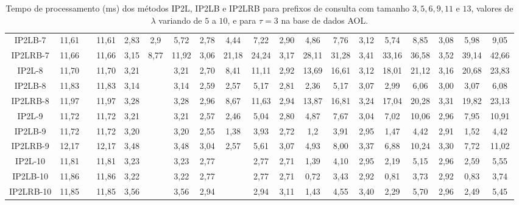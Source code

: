 \begin{table}[h]
{\begin{tabular}{c|ccc|ccc|ccc|ccc|ccc|ccc|}
\multicolumn{1}{|c|}{IP2LB-7} & 11,61 &  & 11,61 & 2,83 & 2,9 & 5,72 & 2,78 & 4,44 & 7,22 & 2,90 & 4,86 & 7,76 & 3,12 & 5,74 & 8,85 & 3,08 & 5,98 & 9,05 \\
\multicolumn{1}{|c|}{IP2LRB-7} & 11,66 &  & 11,66 & 3,15 & 8,77 & 11,92 & 3,06 & 21,18 & 24,24 & 3,17 & 28,11 & 31,28 & 3,41 & 33,16 & 36,58 & 3,52 & 39,14 & 42,66 \\ \hline
\multicolumn{1}{|c|}{IP2L-8} & 11,70 &  & 11,70 & 3,21 &  & 3,21 & 2,70 & 8,41 & 11,11 & 2,92 & 13,69 & 16,61 & 3,12 & 18,01 & 21,12 & 3,16 & 20,68 & 23,83 \\
\multicolumn{1}{|c|}{IP2LB-8} & 11,83 &  & 11,83 & 3,14 &  & 3,14 & 2,59 & 2,57 & 5,17 & 2,81 & 2,36 & 5,17 & 3,07 & 2,99 & 6,06 & 3,00 & 3,07 & 6,08 \\
\multicolumn{1}{|c|}{IP2LRB-8} & 11,97 &  & 11,97 & 3,28 &  & 3,28 & 2,96 & 8,67 & 11,63 & 2,94 & 13,87 & 16,81 & 3,24 & 17,04 & 20,28 & 3,31 & 19,82 & 23,13 \\ \hline
\multicolumn{1}{|c|}{IP2L-9} & 11,72 &  & 11,72 & 3,21 &  & 3,21 & 2,57 & 2,46 & 5,04 & 2,80 & 4,87 & 7,67 & 3,04 & 7,02 & 10,06 & 2,96 & 7,95 & 10,91 \\
\multicolumn{1}{|c|}{IP2LB-9} & 11,72 &  & 11,72 & 3,20 &  & 3,20 & 2,55 & 1,38 & 3,93 & 2,72 & 1,2 & 3,91 & 2,95 & 1,47 & 4,42 & 2,91 & 1,52 & 4,42 \\
\multicolumn{1}{|c|}{IP2LRB-9} & 12,17 &  & 12,17 & 3,48 &  & 3,48 & 3,04 & 2,57 & 5,61 & 3,07 & 4,93 & 8,00 & 3,37 & 6,88 & 10,24 & 3,30 & 7,72 & 11,02 \\ \hline
\multicolumn{1}{|c|}{IP2L-10} & 11,81 &  & 11,81 & 3,23 &  & 3,23 & 2,77 &  & 2,77 & 2,71 & 1,39 & 4,10 & 2,95 & 2,19 & 5,15 & 2,96 & 2,59 & 5,55 \\
\multicolumn{1}{|c|}{IP2LB-10} & 11,86 &  & 11,86 & 3,22 &  & 3,22 & 2,77 &  & 2,77 & 2,71 & 0,72 & 3,43 & 2,92 & 0,81 & 3,73 & 2,92 & 0,83 & 3,74 \\
\multicolumn{1}{|c|}{IP2LRB-10} & 11,85 &  & 11,85 & 3,56 &  & 3,56 & 2,94 &  & 2,94 & 3,11 & 1,43 & 4,55 & 3,40 & 2,29 & 5,70 & 2,96 & 2,49 & 5,45 \\ \hline
\end{tabular}%
}
\caption{Tempo de processamento (ms) dos métodos IP2L, IP2LB e IP2LRB para prefixos de consulta com tamanho $3,5,6,9,11$ e $13$, valores de $\lambda$ variando de $5$ a $10$, e para $\tau=3$ na base de dados AOL.}
\label{tab:methods-processing-time-tau-3-AOL}
\end{table}

